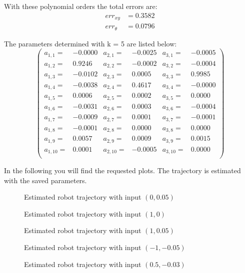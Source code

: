 \documentclass[conference]{IEEEtran}
\begin{document}
\begin{compactenum}[a)]
With these polynomial orders the total errors are:
\begin{align}
	err_{xy} & = 0.3582\\
	err_{\theta} & = 0.0796
\end{align}

The parameters determined with k = 5 are listed below:
\vspace{20pt}
$$
\left(
\scriptscriptstyle{
\begin{smallmatrix}
a_{1,1} =&	 -0.0000	&	a_{2,1} =&  -0.0025	&   a_{3,1} =&	-0.0005 \\
a_{1,2} =&    0.9246    &	a_{2,2} =&	-0.0002	&   a_{3,2} =&	-0.0004 \\
a_{1,3} =&   -0.0102    &	a_{2,3} =&	 0.0005	&	a_{3,3} =&	 0.9985 \\
a_{1,4} =&   -0.0038	&    a_{2,4} =&	 0.4617	&   a_{3,4} =&	-0.0000 \\
a_{1,5} =&    0.0006	&    a_{2,5} =&	 0.0002	&   a_{3,5} =&	 0.0000 \\
a_{1,6} =&   -0.0031	&    a_{2,6} =&	 0.0003	&   a_{3,6} =&	-0.0004 \\
a_{1,7} =&   -0.0009	&    a_{2,7} =&	 0.0001	&   a_{3,7} =&	-0.0001 \\
a_{1,8} =&   -0.0001	&    a_{2,8} =&	 0.0000	&   a_{3,8} =&	 0.0000 \\
a_{1,9} =&    0.0057	&    a_{2,9} =&	 0.0009	&   a_{3,9} =&	 0.0015 \\
a_{1,10} =&   0.0001 	&   a_{2,10} =&	-0.0005	&   a_{3,10} =&	 0.0000 \\
\end{smallmatrix}}
\right)
$$

\item In the following you will find the requested plots. The trajectory is estimated with the saved parameters.
\begin{figure}[h!]
  	\centering
    \scalebox{.6}{}
    \caption{Estimated robot trajectory with input $(0,0.05)$}
    \label{fig:robotLR1}
\end{figure}
\begin{figure}[h!]
  	\centering
    \scalebox{.6}{}
    \caption{Estimated robot trajectory with input $(1,0)$}
    \label{fig:robotLR2}
\end{figure}
\begin{figure}[h!]
  	\centering
    \scalebox{.6}{}
    \caption{Estimated robot trajectory with input $(1,0.05)$}
    \label{fig:robotLR3}
\end{figure}
\begin{figure}[h!]
  	\centering
    \scalebox{.6}{}
    \caption{Estimated robot trajectory with input $(-1,-0.05)$}
    \label{fig:robotLR4}
\end{figure}
\begin{figure}[h!]
  	\centering
    \scalebox{.6}{}
    \caption{Estimated robot trajectory with input $(0.5,-0.03)$}
    \label{fig:robotLR5}
\end{figure}
\end{compactenum}
\end{document}
